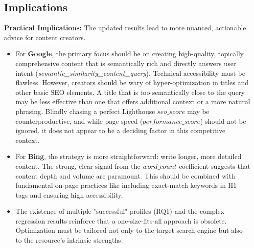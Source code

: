 \documentclass[a4paper,fleqn]{cas-sc}
\newcommand{\longvar}[1]{\textit{#1}}
\begin{document}
\subsection{Implications}
\label{subsec:discussion_implications}
\textbf{Practical Implications:} The updated results lead to more nuanced, actionable advice for content creators.
\begin{itemize}
\item For \textbf{Google}, the primary focus should be on creating high-quality, topically comprehensive content that is semantically rich and directly answers user intent (\longvar{semantic_similarity_content_query}). Technical accessibility must be flawless. However, creators should be wary of hyper-optimization in titles and other basic SEO elements. A title that is too semantically close to the query may be less effective than one that offers additional context or a more natural phrasing. Blindly chasing a perfect Lighthouse $seo\_score$ may be counterproductive, and while page speed ($performance\_score$) should not be ignored, it does not appear to be a deciding factor in this competitive context.
\item For \textbf{Bing}, the strategy is more straightforward: write longer, more detailed content. The strong, clear signal from the $word\_count$ coefficient suggests that content depth and volume are paramount. This should be combined with fundamental on-page practices like including exact-match keywords in H1 tags and ensuring high accessibility.
\item The existence of multiple "successful" profiles (RQ1) and the complex regression results reinforce that a one-size-fits-all approach is obsolete. Optimization must be tailored not only to the target search engine but also to the resource's intrinsic strengths.
\end{itemize}
\end{document}
